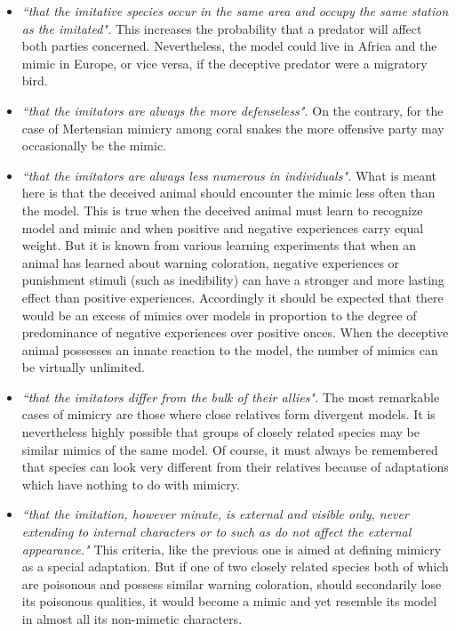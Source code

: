 \documentclass[letterpaper]{article}
\numberwithin{equation}{section}
\begin{document}
\begin{itemize}
	\item \textsl{``that the imitative species occur in the same area and occupy the same station as the imitated".} This increases the probability that a predator will affect both parties concerned. Nevertheless, the model could live in Africa and the mimic in Europe, or vice versa, if the deceptive predator were a migratory bird.
	\item \textsl{``that the imitators are always the more defenseless".} On the contrary, for the case of Mertensian mimicry among coral snakes the more offensive party may occasionally be the mimic.
	\item \textsl{``that the imitators are always less numerous in individuals".} What is meant here is that the deceived animal should encounter the mimic less often than the model. This is true when the deceived animal must learn to recognize model and mimic and when positive and negative experiences carry equal weight. But it is known from various learning experiments that when an animal has learned about warning coloration, negative experiences or punishment stimuli (such as inedibility) can have a stronger and more lasting effect than positive experiences. Accordingly it should be expected that there would be an excess of mimics over models in proportion to the degree of predominance of negative experiences over positive onces. When the deceptive animal possesses an innate reaction to the model, the number of mimics can be virtually unlimited. 
	\item \textsl{``that the imitators differ from the bulk of their allies".} The most remarkable cases of mimicry are those where close relatives form divergent models. It is nevertheless highly possible that groups of closely related species may be similar mimics of the same model. Of course, it must always be remembered that species can look very different from their relatives because of adaptations which have nothing to do with mimicry. 
	\item \textsl{``that the imitation, however minute, is external and visible only, never extending to internal characters or to such as do not affect the external appearance."} This criteria, like the previous one is aimed at defining mimicry as a special adaptation. But if one of two closely related species both of which are poisonous and possess similar warning coloration, should secondarily lose its poisonous qualities, it would become a mimic and yet resemble its model in almost all its non-mimetic characters.
\end{itemize}
\end{document}
